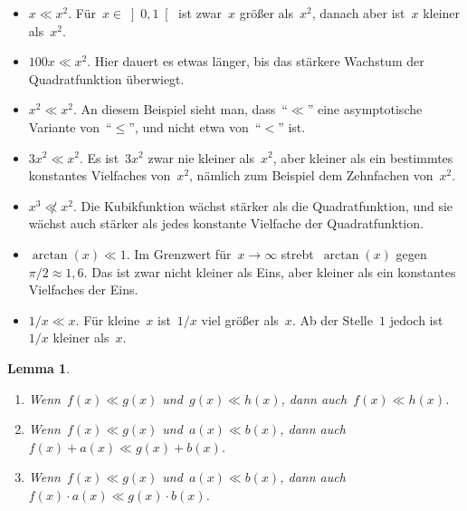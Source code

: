 \documentclass[twoside]{../zirkelblatt1415}
\theoremstyle{definition}
\theoremstyle{plain}
\newtheorem{lemma}[defn]{Lemma}
\theoremstyle{remark}
\begin{document}
\begin{itemize}
\item $x \ll x^2$. Für~$x \in \left]0,1\right[$ ist zwar~$x$ größer als~$x^2$, danach aber
ist~$x$ kleiner als~$x^2$.
\item $100x \ll x^2$. Hier dauert es etwas länger, bis das stärkere Wachstum
der Quadratfunktion überwiegt.
\item $x^2 \ll x^2$. An diesem Beispiel sieht man, dass~"`$\ll$"' eine
asymptotische Variante von~"`$\leq$"', und nicht etwa von~"`$<$"' ist.
\item $3x^2 \ll x^2$. Es ist~$3x^2$ zwar nie kleiner als~$x^2$,
aber kleiner als ein bestimmtes konstantes Vielfaches von~$x^2$, nämlich zum
Beispiel dem Zehnfachen von~$x^2$.
\item $x^3 \not\ll x^2$. Die Kubikfunktion wächst stärker als die
Quadratfunktion, und sie wächst auch stärker als jedes konstante Vielfache der
Quadratfunktion.
\item $\arctan(x) \ll 1$. Im Grenzwert für~$x \to \infty$ strebt~$\arctan(x)$
gegen~$\pi/2 \approx 1{,}6$. Das ist zwar nicht kleiner als Eins, aber kleiner
als ein konstantes Vielfaches der Eins.
\item $1/x \ll x$. Für kleine~$x$ ist~$1/x$ viel größer als~$x$. Ab der
Stelle~$1$ jedoch ist~$1/x$ kleiner als~$x$.
\end{itemize}

\begin{lemma}\label{lemma:asympt}\begin{enumerate}
\item Wenn~$f(x) \ll g(x)$ und~$g(x) \ll h(x)$, dann auch~$f(x) \ll h(x)$.
\item Wenn~$f(x) \ll g(x)$ und~$a(x) \ll b(x)$, dann auch~$f(x)+a(x) \ll
g(x)+b(x)$.
\item Wenn~$f(x) \ll g(x)$ und~$a(x) \ll b(x)$, dann auch~$f(x) \cdot a(x) \ll
g(x) \cdot b(x)$.
\end{enumerate}
\end{lemma}
\end{document}
